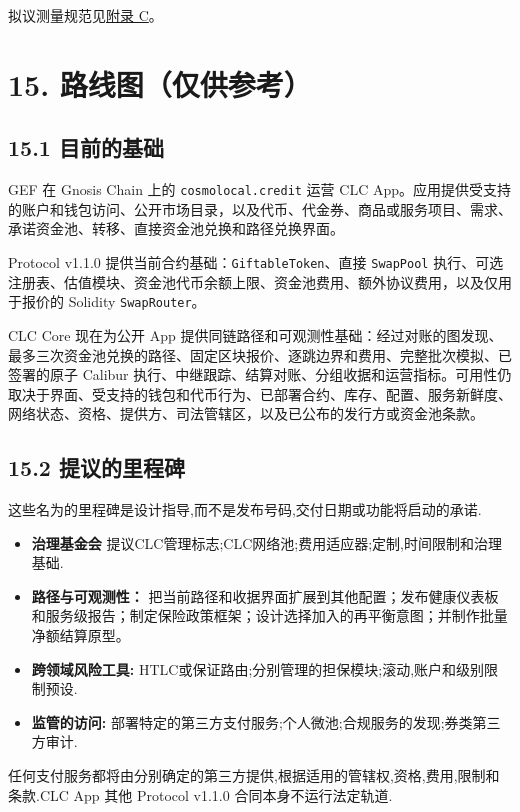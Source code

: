 \documentclass[11pt]{article}
\begin{document}
拟议测量规范见\href{https://docs.cosmolocal.credit/zh/white-paper/appendix-c-kpi-definitions}{附录 C}。


\section*{15. 路线图（仅供参考）}

\subsection*{15.1 目前的基础}

GEF 在 Gnosis Chain 上的 \texttt{cosmolocal.credit} 运营 CLC App。应用提供受支持的账户和钱包访问、公开市场目录，以及代币、代金券、商品或服务项目、需求、承诺资金池、转移、直接资金池兑换和路径兑换界面。

Protocol v1.1.0 提供当前合约基础：\texttt{GiftableToken}、直接 \texttt{SwapPool} 执行、可选注册表、估值模块、资金池代币余额上限、资金池费用、额外协议费用，以及仅用于报价的 Solidity \texttt{SwapRouter}。

CLC Core 现在为公开 App 提供同链路径和可观测性基础：经过对账的图发现、最多三次资金池兑换的路径、固定区块报价、逐跳边界和费用、完整批次模拟、已签署的原子 Calibur 执行、中继跟踪、结算对账、分组收据和运营指标。可用性仍取决于界面、受支持的钱包和代币行为、已部署合约、库存、配置、服务新鲜度、网络状态、资格、提供方、司法管辖区，以及已公布的发行方或资金池条款。

\subsection*{15.2 提议的里程碑}

这些名为的里程碑是设计指导,而不是发布号码,交付日期或功能将启动的承诺.

\begin{itemize}[leftmargin=*]
\item \textbf{治理基金会} 提议CLC管理标志;CLC网络池;费用适应器;定制,时间限制和治理基础.
\item \textbf{路径与可观测性：} 把当前路径和收据界面扩展到其他配置；发布健康仪表板和服务级报告；制定保险政策框架；设计选择加入的再平衡意图；并制作批量净额结算原型。
\item \textbf{跨领域风险工具:} HTLC或保证路由;分别管理的担保模块;滚动,账户和级别限制预设.
\item \textbf{监管的访问:} 部署特定的第三方支付服务;个人微池;合规服务的发现;券类第三方审计.
\end{itemize}
任何支付服务都将由分别确定的第三方提供,根据适用的管辖权,资格,费用,限制和条款.CLC App 其他 Protocol v1.1.0 合同本身不运行法定轨道.
\end{document}
